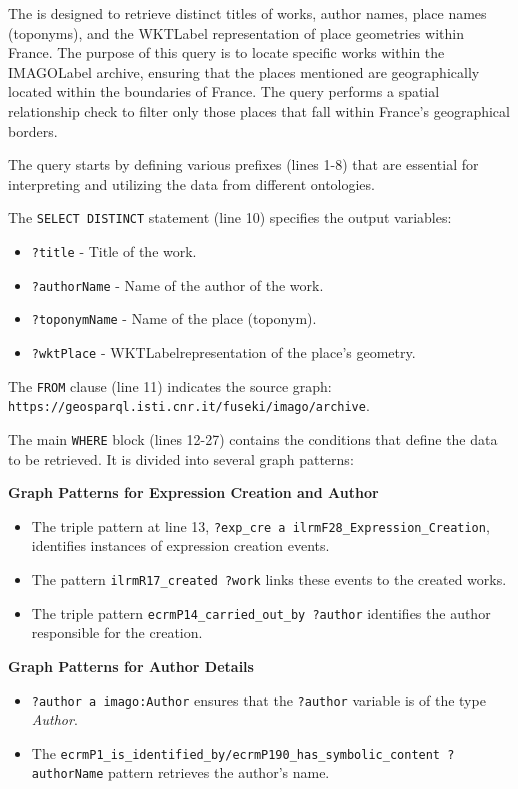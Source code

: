 The  is designed to retrieve distinct titles of works, author names, place names (toponyms), and the \acrshort{WKTLabel} representation of place geometries within France. The purpose of this query is to locate specific works within the \acrshort{IMAGOLabel} archive, ensuring that the places mentioned are geographically located within the boundaries of France. The query performs a spatial relationship check to filter only those places that fall within France’s geographical borders.

The query starts by defining various prefixes (lines 1-8) that are essential for interpreting and utilizing the data from different ontologies. 

The \texttt{SELECT DISTINCT} statement (line 10) specifies the output variables:
\begin{itemize}
    \item \texttt{?title} - Title of the work.
    \item \texttt{?authorName} - Name of the author of the work.
    \item \texttt{?toponymName} - Name of the place (toponym).
    \item \texttt{?wktPlace} - \acrshort{WKTLabel}representation of the place's geometry.
\end{itemize}

The \texttt{FROM} clause (line 11) indicates the source graph:\\
\texttt{https://geosparql.isti.cnr.it/fuseki/imago/archive}.

The main \texttt{WHERE} block (lines 12-27) contains the conditions that define the data to be retrieved. It is divided into several graph patterns:

\textbf{Graph Patterns for Expression Creation and Author}
\begin{itemize}
    \item The triple pattern at line 13, \texttt{?exp\_cre a \gls{ilrm}F28\_Expression\_Creation}, identifies instances of expression creation events.
    \item The pattern \texttt{\gls{ilrm}R17\_created ?work} links these events to the created works.
    \item The triple pattern \texttt{\gls{ecrm}P14\_carried\_out\_by ?author} identifies the author responsible for the creation.
\end{itemize}

\textbf{Graph Patterns for Author Details}
\begin{itemize}
    \item \texttt{?author a imago:Author} ensures that the \texttt{?author} variable is of the type \textit{Author}.
    \item The \texttt{\gls{ecrm}P1\_is\_identified\_by/\gls{ecrm}P190\_has\_symbolic\_content ?authorName} pattern retrieves the author’s name.
\end{itemize}

